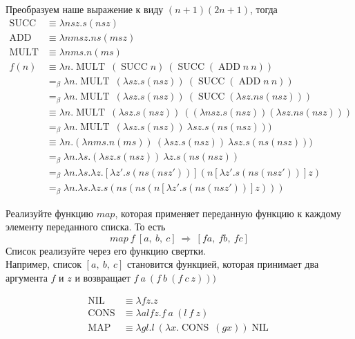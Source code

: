 \documentclass[a4paper,12pt]{article}
\newcounter{zcounter}
\newcommand{\z}{\par\addtocounter{zcounter}{1}%
\textsc{\fbox{\textbf{FP\arabic{zcounter}}}\quad} }
\DeclareMathOperator{\SUCC}{SUCC}
\DeclareMathOperator{\MULT}{MULT}
\DeclareMathOperator{\ADD}{ADD}
\begin{document}
Преобразуем наше выражение к виду $(n + 1)(2n + 1)$, тогда
\begin{align*}
    \SUCC &\equiv \lambda n s z. s(nsz) \\
    \ADD &\equiv \lambda nmsz. ns(msz) \\
    \MULT &\equiv \lambda nms. n(ms) \\
    f(n) &\equiv \lambda n . \MULT \: (\SUCC n) \: (\SUCC (\ADD n \: n)) \\
    &=_\beta \lambda n . \MULT \: (\lambda s z. s(nsz)) \: (\SUCC (\ADD n \: n)) \\
    &=_\beta \lambda n . \MULT \: (\lambda s z. s(nsz)) \: (\SUCC (\lambda sz. ns(nsz))) \\
    &\equiv \lambda n . \MULT \: (\lambda s z. s(nsz)) \: ((\lambda n s z. s(nsz)) (\lambda sz. ns(nsz))) \\
    &=_\beta \lambda n . \MULT \: (\lambda s z. s(nsz)) \: \lambda s z. s(ns(nsz)))\\  
    &\equiv \lambda n . (\lambda nms. n(ms)) \: (\lambda s z. s(nsz)) \: \lambda s z. s(ns(nsz)))\\   
    &=_\beta \lambda n . \lambda s. (\lambda s z. s(nsz)) \: \lambda z. s(ns(nsz)) \\  
    &=_\beta \lambda n . \lambda s. \lambda z. [\lambda z'. s(ns(nsz'))](n[\lambda z'. s(ns(nsz'))]z)  \\    
    &=_\beta \lambda n . \lambda s. \lambda z. s(ns(ns(n[\lambda z'. s(ns(nsz'))]z))) 
\end{align*}
\hfill\break

\z Реализуйте функцию $map$, которая применяет переданную функцию к каждому элементу переданного списка. То есть
\[
map \: f \: [a, \: b, \: c] \: \Longrightarrow \: [f a, \: f b,\: f c]
\]
Список реализуйте через его функцию свертки. \\
Например, список $[a, \: b, \: c]$ становится функцией, которая принимает два аргумента $f$ и $z$ и возвращает $f \: a \: (f \: b \: (f \: c \: z))) $

\begin{align*}
    \operatorname{NIL} &\equiv \lambda fz. z \\ 
    \operatorname{CONS} &\equiv \lambda alfz. f \: a \: (l \: f \: z) \\ 
    \operatorname{MAP}  &\equiv \lambda gl. 
    l \: (\lambda x. \operatorname{CONS} \: (gx)) \operatorname{NIL}  
\end{align*}

\bigbreak
\end{document}
